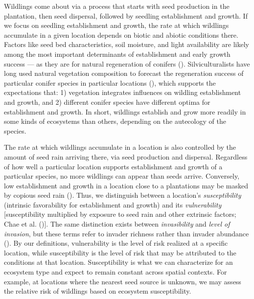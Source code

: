 \documentclass[
]{article}
\begin{document}
Wildlings come about via a process that starts with seed production in the
plantation, then seed dispersal, followed by seedling establishment and growth.
If we focus on seedling establishment and growth, the rate at which wildlings
accumulate in a given location depends on biotic and abiotic conditions there.
Factors like seed bed characteristics, soil moisture, and light availability are
likely among the most important determinants of establishment and early growth
success --- as they are for natural regeneration of conifers
(). Silviculturalists have long used natural
vegetation composition to forecast the regeneration success of particular
conifer species in particular locations
(), which supports the expectations that:
1) vegetation integrates influences on wildling establishment and growth, and 2)
different conifer species have different optima for establishment and growth. In
short, wildlings establish and grow more readily in some kinds of ecosystems
than others, depending on the autecology of the species.

The rate at which wildlings accumulate in a location is also controlled by the
amount of seed rain arriving there, via seed production and dispersal.
Regardless of how well a particular location supports establishment and growth
of a particular species, no more wildlings can appear than seeds arrive.
Conversely, low establishment and growth in a location close to a plantations
may be masked by copious seed rain (). Thus,
we distinguish between a location's \emph{susceptibility} (intrinsic favorability for
establishment and growth) and its \emph{vulnerability} {[}susceptibility multiplied by
exposure to seed rain and other extrinsic factors;
Chae et al. (){]}. The same distinction exists between
\emph{invasibility} and \emph{level of invasion}, but these terms refer to invader
richness rather than invader abundance ().
By our definitions, vulnerability is the level of risk realized at a specific
location, while susceptibility is the level of risk that may be attributed to
the conditions at that location. Susceptibility is what we can characterize for
an ecosystem type and expect to remain constant across spatial contexts. For
example, at locations where the nearest seed source is unknown, we may assess
the relative risk of wildlings based on ecosystem susceptibility.
\end{document}
